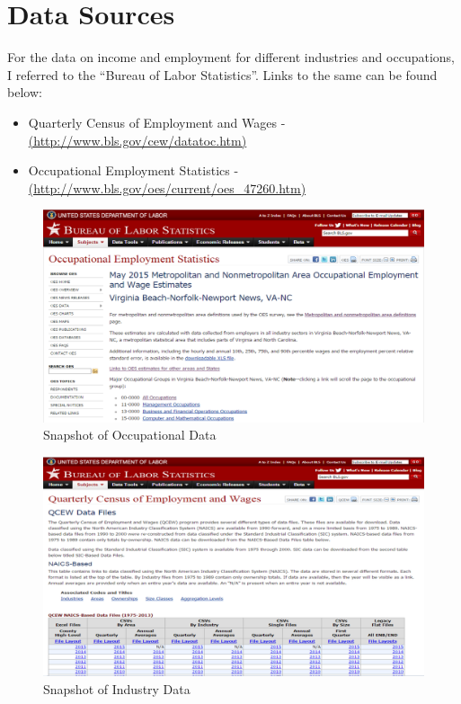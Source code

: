 \documentclass[12pt]{article}
\begin{document}
\section{Data Sources}
For the data on income and employment for different industries and occupations, I referred to the ``Bureau of Labor Statistics''. Links to the same can be found below: 
\begin{itemize}
\item Quarterly Census of Employment and Wages - \url{(http://www.bls.gov/cew/datatoc.htm)}  
\item Occupational Employment Statistics - \url{(http://www.bls.gov/oes/current/oes_47260.htm)}
\end{itemize}
\begin{figure}[htp]
\centering
\includegraphics[scale = 0.35]{OCC.png}
\caption{Snapshot of Occupational Data}
\label{highq}
\end{figure}
\begin{figure}[htp]
\centering
\includegraphics[scale = 0.35]{IND.png}
\caption{Snapshot of Industry Data}
\label{highq}
\end{figure}
\newpage
\end{document}
